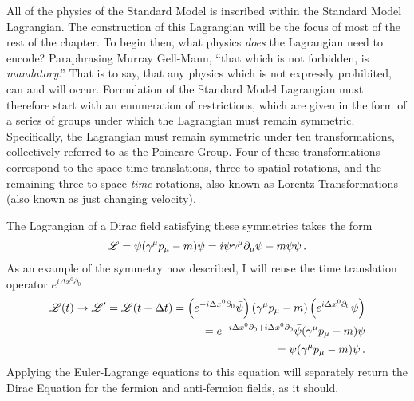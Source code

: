     All of the physics of the Standard Model is inscribed within the Standard Model Lagrangian.
    The construction of this Lagrangian will be the focus of most of the rest of the chapter.
    To begin then, what physics \textit{does} the Lagrangian need to encode?
    Paraphrasing Murray Gell-Mann, ``that which is not forbidden, is \textit{mandatory}\cite{Gell-Mann_mandatory}.''
    That is to say, that any physics which is not expressly prohibited, can and will occur.
    Formulation of the Standard Model Lagrangian must therefore start with an enumeration of restrictions,
        which are given in the form of a series of groups under which the Lagrangian must remain symmetric.
    Specifically, the Lagrangian must remain symmetric under ten transformations,
        collectively referred to as the Poincare Group.
    Four of these transformations correspond to the space-time translations,
        three to spatial rotations, and the remaining three to space-\textit{time} rotations,
        also known as Lorentz Transformations (also known as just changing velocity).

    The Lagrangian of a Dirac field satisfying these symmetries takes the form
    \begin{equation} \label{eq:basic_fermionL}
        \mathscr{L} = \bar{\psi} (\gamma^\mu p_\mu - m) \psi = i \bar{\psi} \gamma^\mu \partial_\mu \psi - m \bar{\psi} \psi
        \,.
    \end{equation}
    As an example of the symmetry now described, I will reuse the time translation operator $e^{i\Delta x^0 \partial_0}$
    \begin{equation} \begin{split}
        \mathscr{L}(t) \to \mathscr{L}' = \mathscr{L}(t+\Delta t) =
            \left( e^{-i\Delta x^0 \partial_0} \bar{\psi} \right) (\gamma^\mu p_\mu - m) \left( e^{i\Delta x^0 \partial_0}\psi \right)
        \\  = e^{-i\Delta x^0 \partial_0 + i \Delta x^0 \partial_0} \bar{\psi} (\gamma^\mu p_\mu - m) \psi
        \\  = \bar{\psi} (\gamma^\mu p_\mu - m) \psi
        \,.
    \end{split} \end{equation}
    Applying the Euler-Lagrange equations to this equation will separately return the Dirac Equation
        for the fermion and anti-fermion fields, as it should.

